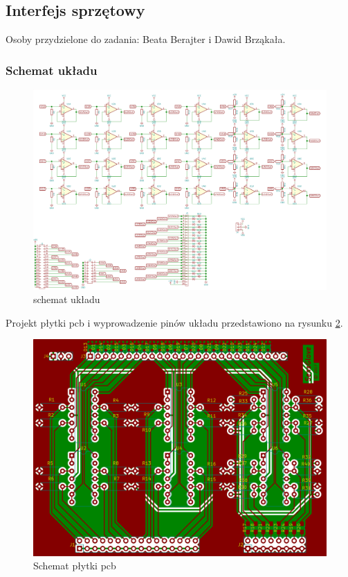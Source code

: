 \documentclass{article}
\begin{document}
\subsection{Interfejs sprzętowy}

Osoby przydzielone do zadania: Beata Berajter i Dawid Brząkała. \\
\subsubsection{Schemat układu}
\begin{figure}[!h]
	\centering
	\includegraphics[width=15cm]{schemat.png}
	\caption{schemat układu}
	\label{rys:schemat_ukladu}
\end{figure}

Projekt płytki pcb i wyprowadzenie pinów układu przedstawiono na rysunku  \ref{rys:pcb}.

\begin{figure}[H]
	\centering
	\includegraphics[width=12cm]{pcb.png}
	\caption{Schemat płytki pcb}
	\label{rys:pcb}
\end{figure}
\end{document}
